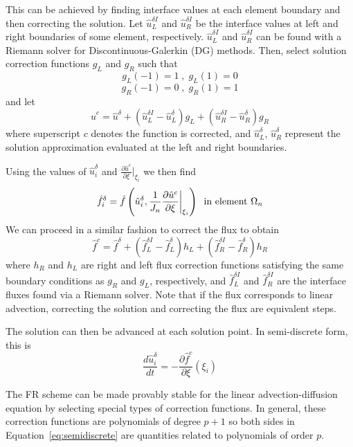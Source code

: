 This can be achieved by finding interface values at each element boundary and then correcting the 
solution. Let $\hat{u}_L^{\delta I}$ and $\hat{u}_R^{\delta I}$ be the interface values at left and right 
boundaries of some element, respectively. $\hat{u}_L^{\delta I}$ and $\hat{u}_R^{\delta I}$ can be found with a Riemann solver for Discontinuous-Galerkin (DG) methods\cite{hesthaven2007}. Then, select solution correction functions $g_L$ and 
$g_R$ such 
that
\begin{equation}\label{eq:condition}
g_L(-1) = 1 \;,\; g_L(1) = 0
\end{equation}
\begin{equation}
g_R(-1) = 0 \;,\; g_R(1) = 1
\end{equation}
and let
\begin{equation}
\hat{u}^c = \hat{u}^\delta + (\hat{u}^{\delta I}_L - \hat{u}^\delta_L) g_L + (\hat{u}^{\delta I}_R 
- \hat{u}^\delta_R) g_R
\end{equation}
where superscript $c$ denotes the function is corrected, and $\hat{u}^\delta_L$, $\hat{u}^\delta_R$ 
represent the solution approximation evaluated at the left and right boundaries.

Using the values of $\hat{u}^\delta_i$ and $\frac{\partial \hat{u}^c}{\partial \xi}|_{\xi_i}$ we then find 
$$\hat{f}_i^\delta = \hat{f}\left(\hat{u}^\delta_i,\frac{1}{J_n}\frac{\partial \hat{u}^c}{\partial \xi}\bigg|_{\xi_i}\right) \;\; \text{in element } \Omega_n$$
We can proceed in a similar fashion to correct the flux to obtain
\begin{equation}
\hat{f}^c = \hat{f}^\delta + (\hat{f}^{\delta I}_L - \hat{f}^\delta_L) h_L + (\hat{f}^{\delta I}_R 
- \hat{f}^\delta_R) h_R
\end{equation}
where $h_R$ and $h_L$ are right and left flux correction functions satisfying the same boundary 
conditions as $g_R$ and $g_L$, respectively, and $\hat{f}_L^{\delta I}$ and $\hat{f}_R^{\delta I}$ are the interface fluxes found via a Riemann solver. Note that if the flux corresponds to linear advection, correcting the solution and correcting the flux are equivalent steps.

The solution can then be advanced at each solution point. In semi-discrete form, this is
\begin{equation}\label{eq:semidiscrete}
\frac{d \hat{u}_i^\delta}{d t} = - \frac{\partial \hat{f}^c}{\partial \xi}(\xi_i)
\end{equation}

The FR scheme can be made provably stable for the linear advection-diffusion equation by selecting special types of correction functions\cite{castonguay2013}. In general, these correction functions are polynomials of degree $p+1$ so both sides in Equation~\eqref{eq:semidiscrete} are quantities related to polynomials of order $p$.

